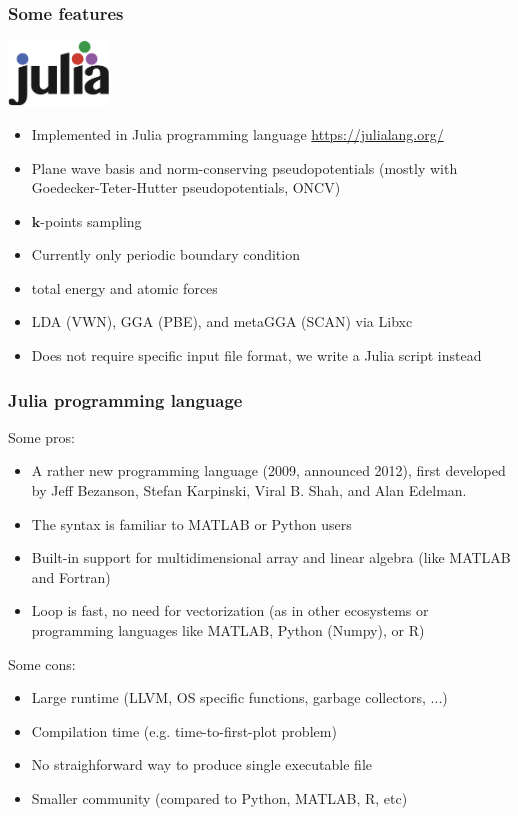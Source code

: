 \begin{frame}
\frametitle{Some features}

{\centering
\includegraphics[width=0.20\textwidth]{images/julia_logo_v1.pdf}
\par}

\begin{itemize}
\item Implemented in Julia programming language {\footnotesize \url{https://julialang.org/}}
\item Plane wave basis and norm-conserving pseudopotentials (mostly with
Goedecker-Teter-Hutter pseudopotentials, ONCV)
\item $\mathbf{k}$-points sampling
\item Currently only periodic boundary condition
\item total energy and atomic forces
\item LDA (VWN), GGA (PBE), and metaGGA (SCAN) via Libxc
\item Does not require specific input file format, we write a Julia
script instead
\end{itemize}

\end{frame}


\begin{frame}
\frametitle{Julia programming language}

Some pros:
\begin{itemize}
\item A rather new programming language (2009, announced 2012), first developed by
Jeff Bezanson, Stefan Karpinski, Viral B. Shah, and Alan Edelman.
\item The syntax is familiar to MATLAB or Python users
\item Built-in support for multidimensional array and linear algebra
(like MATLAB and Fortran)
\item Loop is fast, no need for vectorization (as in other ecosystems or
programming languages like MATLAB, Python (Numpy), or R)
\end{itemize}

Some cons:
\begin{itemize}
\item Large runtime (LLVM, OS specific functions, garbage collectors, ...)
\item Compilation time (e.g. time-to-first-plot problem)
\item No straighforward way to produce single executable file
\item Smaller community (compared to Python, MATLAB, R, etc)
\end{itemize}


\end{frame}




